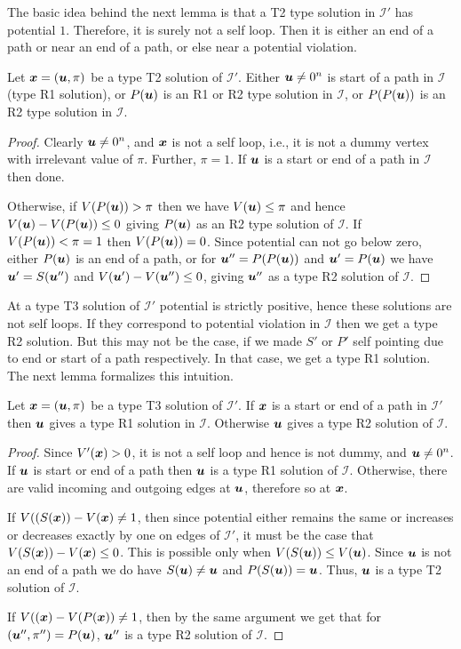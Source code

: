 \documentclass[a4paper,UKenglish]{lipics2}
\theoremstyle{definition}
\newcommand{\CI}{\mbox{${\mathcal I}$}}
\newcommand{\uu}{\mbox{\boldmath $u$}}
\newcommand{\xx}{\mbox{\boldmath $x$}}
\begin{document}
The basic idea behind the next lemma is that a T2 type solution in $\CI'$ has
potential $1$. Therefore, it is surely not a self loop. Then it is either an end of a path or near an end of a path, or else near a potential violation. 

\begin{lemma}\label{lem:p2m-t2}
Let $\xx=(\uu,\pi)$ be a type T2 solution of $\CI'$. Either $\uu \neq 0^n$ is start of a path in $\CI$ (type R1 solution), or $P(\uu)$ is an R1 or R2 type solution in $\CI$, or $P(P(\uu))$ is an R2 type solution in $\CI$.
\end{lemma}

\begin{proof}
Clearly $\uu \neq 0^n$, and $\xx$ is not a self loop, i.e., it is not a dummy vertex with irrelevant value of $\pi$. Further, $\pi=1$. If $\uu$ is a start or end of a path in $\CI$ then done. 

Otherwise, if $V(P(\uu))>\pi$ then we have $V(\uu)\le \pi$ and hence $V(\uu)-V(P(\uu))\le 0$ giving $P(\uu)$ as an R2 type solution of $\CI$. 
If $V(P(\uu))<\pi=1$ then $V(P(\uu))=0$. Since potential can not go below zero, either $P(\uu)$ is an end of a path, or for $\uu''=P(P(\uu))$ and $\uu'=P(\uu)$ we have $\uu'=S(\uu'')$ and $V(\uu')-V(\uu'')\le 0$, giving $\uu''$ as a type R2 solution of $\CI$.
\end{proof}

At a type T3 solution of $\CI'$ potential is strictly positive, hence these solutions are not self loops. If they correspond to potential violation in $\CI$ then we get a type R2 solution. But this may not be the case, if we made $S'$ or $P'$ self pointing due to end or start of a path respectively. In that case, we get a type R1 solution. The next lemma formalizes this intuition. 

\begin{lemma}\label{lem:p2m-t3}
Let $\xx=(\uu,\pi)$ be a type T3 solution of $\CI'$. If $\xx$ is a start or end of a path in $\CI'$ then $\uu$ gives a type R1 solution in $\CI$. Otherwise $\uu$ gives a type R2 solution of $\CI$.
\end{lemma}

\begin{proof}
Since $V'(\xx)>0$, it is not a self loop and hence is not dummy, and $\uu\neq 0^n$. If $\uu$ is start or end of a path then $\uu$ is a type R1 solution of $\CI$. Otherwise, there are valid incoming and outgoing edges at $\uu$, therefore so at $\xx$. 

If $V((S(\xx))-V(\xx)\neq 1$, then since potential either remains the same or increases or decreases exactly by one on edges of $\CI'$, it must be the case that $V(S(\xx))-V(\xx)\le 0$. This is possible only when $V(S(\uu))\le V(\uu)$. Since $\uu$ is not an end of a path we do have $S(\uu)\neq \uu$ and $P(S(\uu))=\uu$. Thus, $\uu$ is a type T2 solution of $\CI$.

If $V((\xx)-V(P(\xx))\neq 1$, then by the same argument we get that for $(\uu'',\pi'')=P(\uu)$, $\uu''$ is a type R2 solution of $\CI$. 
\end{proof}
\end{document}
